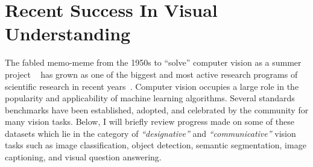 \section{Recent Success In Visual Understanding}
The fabled memo-meme from the 1950s to ``solve'' computer vision as a summer project ~\citep{papert1966summer} has grown as one of the biggest and most active research programs of scientific research in recent years~\citep{su2021affective}.
Computer vision occupies a large role in the popularity and applicability of machine learning algorithms.
Several standards benchmarks have been established, adopted, and celebrated by the community for many vision tasks.
Below, I will briefly review progress made on some of these datasets which lie in the category of \textit{``designative''} and \textit{``communicative''} vision tasks such as image classification, object detection, semantic segmentation, image captioning, and visual question answering.
